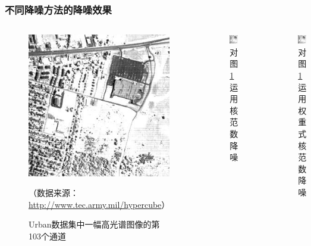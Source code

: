 \documentclass[10pt,aspectratio=43,mathserif]{beamer}
\begin{document}
\begin{frame}
\frametitle{\textbf{不同降噪方法的降噪效果}}
\begin{columns}
\begin{figure}
\centering
\includegraphics[scale=0.45]{band-103.jpg}
\caption{Urban数据集中一幅高光谱图像的第103个通道}
\label{band-103}
{\scriptsize{（数据来源：{\url{http://www.tec.army.mil/hypercube}}）}}
\end{figure}

\begin{figure}
\centering
\includegraphics[scale=0.2]{band-103-NN.jpg}
\caption{对图\ref{band-103}运用核范数降噪}
\end{figure}
\begin{figure}
\centering
\includegraphics[scale=0.2]{band-103-WNN.jpg}
\caption{对图\ref{band-103}运用权重式核范数降噪}
\end{figure}


\end{columns}
\end{frame}
\end{document}
